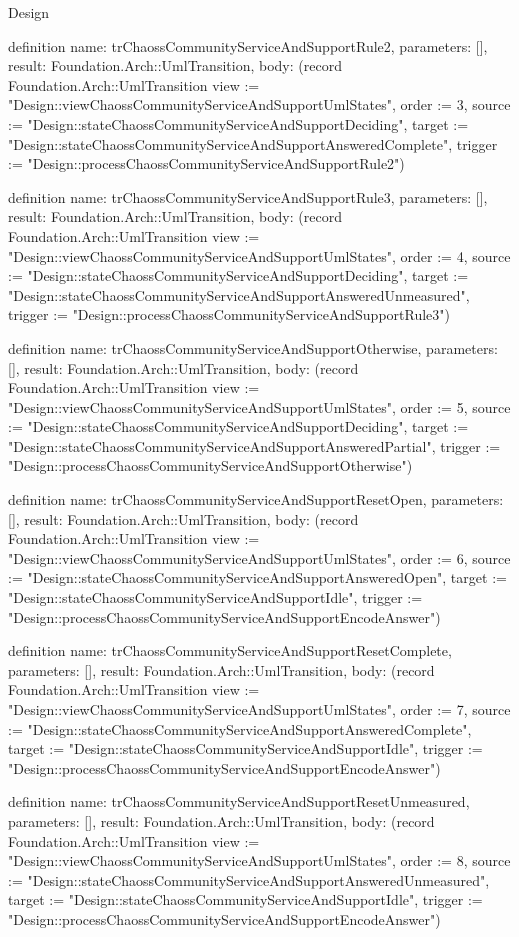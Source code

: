 \begin{lexlean}{Design}
\begin{semanticmodule}
definition{
  name: trChaossCommunityServiceAndSupportRule2,
  parameters: [],
  result: Foundation.Arch::UmlTransition,
  body: (record Foundation.Arch::UmlTransition {view := "Design::viewChaossCommunityServiceAndSupportUmlStates", order := 3, source := "Design::stateChaossCommunityServiceAndSupportDeciding", target := "Design::stateChaossCommunityServiceAndSupportAnsweredComplete", trigger := "Design::processChaossCommunityServiceAndSupportRule2"})
}

definition{
  name: trChaossCommunityServiceAndSupportRule3,
  parameters: [],
  result: Foundation.Arch::UmlTransition,
  body: (record Foundation.Arch::UmlTransition {view := "Design::viewChaossCommunityServiceAndSupportUmlStates", order := 4, source := "Design::stateChaossCommunityServiceAndSupportDeciding", target := "Design::stateChaossCommunityServiceAndSupportAnsweredUnmeasured", trigger := "Design::processChaossCommunityServiceAndSupportRule3"})
}

definition{
  name: trChaossCommunityServiceAndSupportOtherwise,
  parameters: [],
  result: Foundation.Arch::UmlTransition,
  body: (record Foundation.Arch::UmlTransition {view := "Design::viewChaossCommunityServiceAndSupportUmlStates", order := 5, source := "Design::stateChaossCommunityServiceAndSupportDeciding", target := "Design::stateChaossCommunityServiceAndSupportAnsweredPartial", trigger := "Design::processChaossCommunityServiceAndSupportOtherwise"})
}

definition{
  name: trChaossCommunityServiceAndSupportResetOpen,
  parameters: [],
  result: Foundation.Arch::UmlTransition,
  body: (record Foundation.Arch::UmlTransition {view := "Design::viewChaossCommunityServiceAndSupportUmlStates", order := 6, source := "Design::stateChaossCommunityServiceAndSupportAnsweredOpen", target := "Design::stateChaossCommunityServiceAndSupportIdle", trigger := "Design::processChaossCommunityServiceAndSupportEncodeAnswer"})
}

definition{
  name: trChaossCommunityServiceAndSupportResetComplete,
  parameters: [],
  result: Foundation.Arch::UmlTransition,
  body: (record Foundation.Arch::UmlTransition {view := "Design::viewChaossCommunityServiceAndSupportUmlStates", order := 7, source := "Design::stateChaossCommunityServiceAndSupportAnsweredComplete", target := "Design::stateChaossCommunityServiceAndSupportIdle", trigger := "Design::processChaossCommunityServiceAndSupportEncodeAnswer"})
}

definition{
  name: trChaossCommunityServiceAndSupportResetUnmeasured,
  parameters: [],
  result: Foundation.Arch::UmlTransition,
  body: (record Foundation.Arch::UmlTransition {view := "Design::viewChaossCommunityServiceAndSupportUmlStates", order := 8, source := "Design::stateChaossCommunityServiceAndSupportAnsweredUnmeasured", target := "Design::stateChaossCommunityServiceAndSupportIdle", trigger := "Design::processChaossCommunityServiceAndSupportEncodeAnswer"})
}


\end{semanticmodule}
\end{lexlean}
